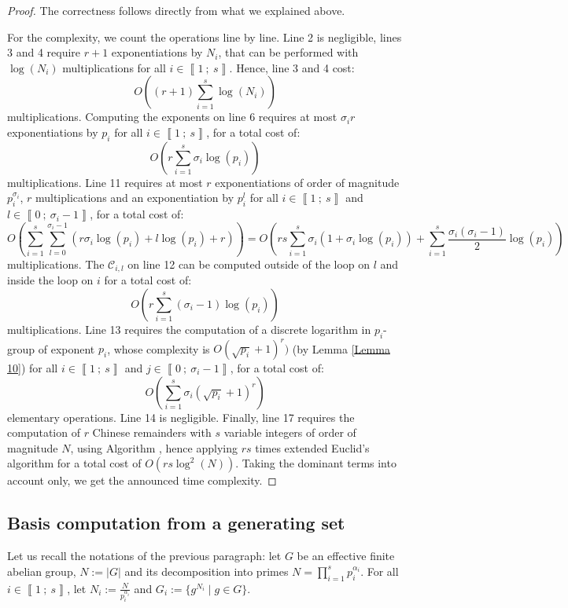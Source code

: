 \documentclass[a4paper,10pt,notitlepage]{report}
\theoremstyle{definition}
\theoremstyle{plain}
\theoremstyle{definition}
\newcommand{\m}[1]{\mathcal{#1}}
\renewcommand{\i}[2]{\left\llbracket #1~;~#2\right\rrbracket}
\renewcommand{\(}{\left(}
\renewcommand{\)}{\right)}
\begin{document}
\begin{proof}
The correctness follows directly from what we explained above. 

For the complexity, we count the operations line by line. Line 2 is negligible, lines 3 and 4 require $r+1$ exponentiations by $N_i$, that can be performed with $\log(N_i)$ multiplications for all $i\in\i{1}{s}$. Hence, line 3 and 4 cost:
\[O\((r+1)\sum_{i=1}^s \log(N_i)\)\] 
multiplications. Computing the exponents on line 6 requires at most $\sigma_i r$ exponentiations by $p_i$ for all $i\in\i{1}{s}$, for a total cost of:
\[O\(r\sum_{i=1}^s\sigma_i\log(p_i)\)\]
multiplications.  Line 11 requires at most $r$ exponentiations of order of magnitude $p_i^{\sigma_i}$, $r$ multiplications and an exponentiation by $p_i^{l}$ for all $i\in\i{1}{s}$ and $l\in\i{0}{\sigma_i-1}$, for a total cost of:
\[O\(\sum_{i=1}^s\sum_{l=0}^{\sigma_i-1}(r\sigma_i\log(p_i)+l\log(p_i)+r)\)=O\(rs\sum_{i=1}^s\sigma_i(1+\sigma_i\log(p_i))+\sum_{i=1}^s\frac{\sigma_i(\sigma_i-1)}{2}\log(p_i)\)\]
multiplications. The $\m{C}_{i,l}$ on line 12 can be computed outside of the loop on $l$ and inside the loop on $i$ for a total cost of:
\[O\(r\sum_{i=1}^s(\sigma_i-1)\log(p_i)\)\]
multiplications. Line 13 requires the computation of a discrete logarithm in $p_i$-group of exponent $p_i$, whose complexity is $O(\sqrt{p_i}+1)^r)$ (by Lemma \ref{Lemma 10}) for all $i\in\i{1}{s}$ and $j\in\i{0}{\sigma_i-1}$, for a total cost of:
\[O\(\sum_{i=1}^s\sigma_i(\sqrt{p_i}+1)^r\)\]
elementary operations. Line 14 is negligible. Finally, line 17 requires the computation of $r$ Chinese remainders with $s$ variable integers of order of magnitude $N$, using Algorithm \cite[Algorithm 1.3.12]{Cohen1}, hence applying $rs$ times extended Euclid's algorithm for a total cost of $O(rs\log^2(N))$. Taking the dominant terms into account only, we get the announced time complexity.
\end{proof}


\subsection{Basis computation from a generating set}

Let us recall the notations of the previous paragraph: let $G$ be an effective finite abelian group, $N:=|G|$ and its decomposition into primes $N=\prod_{i=1}^s p_i^{\alpha_i}$. For  all $i\in\i{1}{s}$, let $N_i:=\frac{N}{p_i^{\alpha_i}}$ and $G_i:=\{g^{N_i}\mid g\in G\}$.
\end{document}

